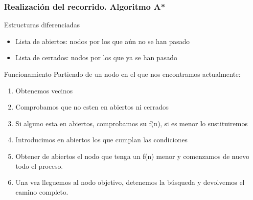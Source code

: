 \begin{frame}
    \frametitle{Realización del recorrido. Algoritmo A*}

        \begin{block}{Estructuras diferenciadas}
            \begin{itemize}
                \item Lista de abiertos: nodos por los que aún no se han pasado
                \item Lista de cerrados: nodos por los que ya se han pasado
            \end{itemize}
        \end{block}

        \begin{block}{Funcionamiento}
            Partiendo de un nodo en el que nos encontramos actualmente:
            \begin{enumerate}
                \item Obtenemos vecinos
                \item Comprobamos que no esten en abiertos ni cerrados
                \item Si alguno esta en abiertos, comprobamos su f(n), si es menor lo sustituiremos
                \item Introducimos en abiertos los que cumplan las condiciones
                \item Obtener de abiertos el nodo que tenga un f(n) menor y comenzamos de nuevo todo el proceso.
                \item Una vez lleguemos al nodo objetivo, detenemos la búsqueda y devolvemos el camino completo.
            \end{enumerate}
        \end{block}

\end{frame}

